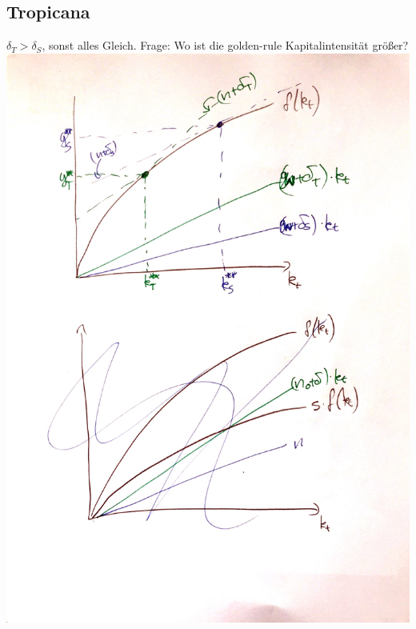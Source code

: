 \documentclass{scrartcl}
\begin{document}
\subsection{Tropicana}
$\delta_T > \delta_S$, sonst alles Gleich. Frage: Wo ist die golden-rule Kapitalintensit\"{a}t gr\"{o}{\ss}er?\\
\includegraphics[width=\textwidth,keepaspectratio]{Bilder/SolowTropicana.pdf}
\end{document}

